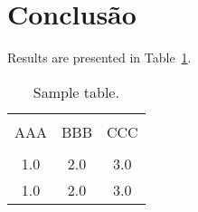 \documentclass[jou,apacite]{apa6}
\begin{document}
\section{Conclusão}





Results are presented in Table~\ref{tab1}.
\begin{table}[!htb]
\caption{Sample table.}\label{tab1}
\begin{tabular}{ccc}
\hline\\[-1.5ex]
AAA & BBB & CCC \\[0.5ex]
\hline\\[-1.5ex]
1.0 & 2.0 & 3.0\\[0.5ex]
1.0 & 2.0 & 3.0\\[0.5ex]
\hline
\end{tabular}
\end{table}



\end{document}
